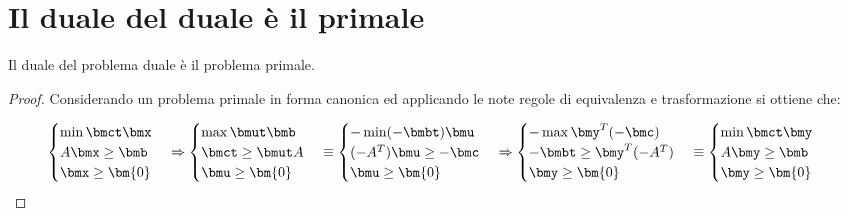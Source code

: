 \documentclass[\main/main.tex]{subfiles}
\begin{document}
\section{Il duale del duale è il primale}
\begin{theorem}
  Il duale del problema duale è il problema primale.
\end{theorem}

\begin{proof}
  Considerando un problema primale in forma canonica ed applicando le note regole di equivalenza e trasformazione si ottiene che:

  \[
    \begin{cases}
      \min \bmct \bmx \\
      A\bmx \geq \bmb \\
      \bmx \geq \bm{0}
    \end{cases}
    \Rightarrow
    \begin{cases}
      \max \bmut\bmb     \\
      \bmct \geq \bmut A \\
      \bmu \geq \bm{0}
    \end{cases}
    \equiv
    \begin{cases}
      - \min (-\bmbt)\bmu   \\
      (-A^T)\bmu \geq -\bmc \\
      \bmu \geq \bm{0}
    \end{cases}
    \Rightarrow
    \begin{cases}
      - \max \bmy^T(-\bmc)     \\
      -\bmbt \geq \bmy^T(-A^T) \\
      \bmy \geq \bm{0}
    \end{cases}
    \equiv
    \begin{cases}
      \min \bmct \bmy \\
      A\bmy\geq \bmb  \\
      \bmy \geq \bm{0}
    \end{cases}
  \]

\end{proof}
\end{document}
